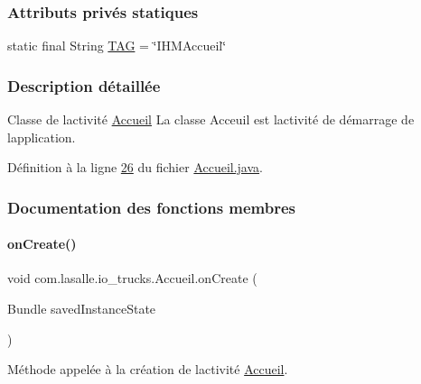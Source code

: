 \subsubsection*{Attributs privés statiques}
\begin{DoxyCompactItemize}
\item 
static final String \hyperlink{classcom_1_1lasalle_1_1io__trucks_1_1_accueil_a1a3ee3728fab660903bb4399a2e49d49}{T\+AG} = \char`\"{}I\+H\+M\+Accueil\char`\"{}
\end{DoxyCompactItemize}


\subsubsection{Description détaillée}
Classe de l\textquotesingle{}activité \hyperlink{classcom_1_1lasalle_1_1io__trucks_1_1_accueil}{Accueil}  La classe Acceuil est l\textquotesingle{}activité de démarrage de l\textquotesingle{}application. 

Définition à la ligne \hyperlink{_accueil_8java_source_l00026}{26} du fichier \hyperlink{_accueil_8java_source}{Accueil.\+java}.



\subsubsection{Documentation des fonctions membres}
\mbox{\label{classcom_1_1lasalle_1_1io__trucks_1_1_accueil_acd7cff413b44344de6b037c85f4f50bb}} 
\paragraph{\texorpdfstring{on\+Create()}{onCreate()}}
{\footnotesize\ttfamily void com.\+lasalle.\+io\+\_\+trucks.\+Accueil.\+on\+Create (\begin{DoxyParamCaption}\item[{Bundle}]{saved\+Instance\+State }\end{DoxyParamCaption})\hspace{0.3cm}{\ttfamily [protected]}}



Méthode appelée à la création de l\textquotesingle{}activité \hyperlink{classcom_1_1lasalle_1_1io__trucks_1_1_accueil}{Accueil}. 


